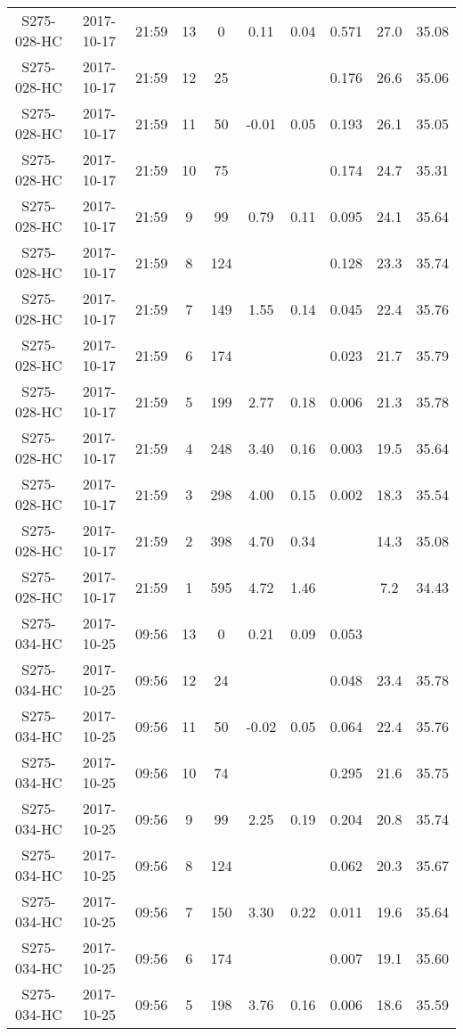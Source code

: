 \begin{longtable}{cccccccccc}
  S275-028-HC & 2017-10-17 & 21:59 & 13 & 0 & 0.11 & 0.04 & 0.571 & 27.0 & 35.08 \\ 
  S275-028-HC & 2017-10-17 & 21:59 & 12 & 25 &  &  & 0.176 & 26.6 & 35.06 \\ 
  S275-028-HC & 2017-10-17 & 21:59 & 11 & 50 & -0.01 & 0.05 & 0.193 & 26.1 & 35.05 \\ 
  S275-028-HC & 2017-10-17 & 21:59 & 10 & 75 &  &  & 0.174 & 24.7 & 35.31 \\ 
  S275-028-HC & 2017-10-17 & 21:59 & 9 & 99 & 0.79 & 0.11 & 0.095 & 24.1 & 35.64 \\ 
  S275-028-HC & 2017-10-17 & 21:59 & 8 & 124 &  &  & 0.128 & 23.3 & 35.74 \\ 
  S275-028-HC & 2017-10-17 & 21:59 & 7 & 149 & 1.55 & 0.14 & 0.045 & 22.4 & 35.76 \\ 
  S275-028-HC & 2017-10-17 & 21:59 & 6 & 174 &  &  & 0.023 & 21.7 & 35.79 \\ 
  S275-028-HC & 2017-10-17 & 21:59 & 5 & 199 & 2.77 & 0.18 & 0.006 & 21.3 & 35.78 \\ 
  S275-028-HC & 2017-10-17 & 21:59 & 4 & 248 & 3.40 & 0.16 & 0.003 & 19.5 & 35.64 \\ 
  S275-028-HC & 2017-10-17 & 21:59 & 3 & 298 & 4.00 & 0.15 & 0.002 & 18.3 & 35.54 \\ 
  S275-028-HC & 2017-10-17 & 21:59 & 2 & 398 & 4.70 & 0.34 &  & 14.3 & 35.08 \\ 
  S275-028-HC & 2017-10-17 & 21:59 & 1 & 595 & 4.72 & 1.46 &  & 7.2 & 34.43 \\ 
  S275-034-HC & 2017-10-25 & 09:56 & 13 & 0 & 0.21 & 0.09 & 0.053 &  &  \\ 
  S275-034-HC & 2017-10-25 & 09:56 & 12 & 24 &  &  & 0.048 & 23.4 & 35.78 \\ 
  S275-034-HC & 2017-10-25 & 09:56 & 11 & 50 & -0.02 & 0.05 & 0.064 & 22.4 & 35.76 \\ 
  S275-034-HC & 2017-10-25 & 09:56 & 10 & 74 &  &  & 0.295 & 21.6 & 35.75 \\ 
  S275-034-HC & 2017-10-25 & 09:56 & 9 & 99 & 2.25 & 0.19 & 0.204 & 20.8 & 35.74 \\ 
  S275-034-HC & 2017-10-25 & 09:56 & 8 & 124 &  &  & 0.062 & 20.3 & 35.67 \\ 
  S275-034-HC & 2017-10-25 & 09:56 & 7 & 150 & 3.30 & 0.22 & 0.011 & 19.6 & 35.64 \\ 
  S275-034-HC & 2017-10-25 & 09:56 & 6 & 174 &  &  & 0.007 & 19.1 & 35.60 \\ 
  S275-034-HC & 2017-10-25 & 09:56 & 5 & 198 & 3.76 & 0.16 & 0.006 & 18.6 & 35.59 \\ 

\end{longtable}

